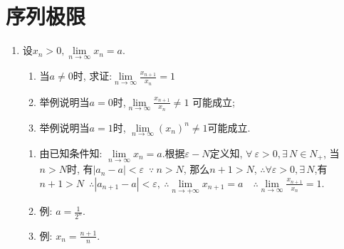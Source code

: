 \section{序列极限}
\begin{enumerate}
	\item 设$x_n>0, \lim\limits_{n\rightarrow \infty}x_n=a$.
	\begin{enumerate}
		\item 当$a\ne 0$时, 求证:$\lim\limits_{n \rightarrow \infty}\frac{x_{n+1}}{x_{n}}=1$
		\item 举例说明当$a=0$时,$\lim\limits_{n \rightarrow \infty}\frac{x_{n+1}}{x_{n}} \ne 1$ 可能成立;
		\item 举例说明当$a=1$时, $\lim\limits_{n \rightarrow \infty}(x_n)^n\ne 1$可能成立.
	\end{enumerate}
	\begin{solution}
		\begin{enumerate}
			\item 由已知条件知: $\lim\limits_{n\rightarrow \infty}x_n=a$.根据$\varepsilon-N$定义知, $\forall\ \varepsilon>0, \exists\, N \in N_+$, 当$n>N$时, 有$|a_n-a|<\varepsilon$\ $\because \ n>N$, 那么$n+1>N$, $\therefore \forall \varepsilon>0, \exists \,N$,有$n+1>N$\  $\therefore |a_{n+1}-a|<\varepsilon,\ \therefore \lim\limits_{n\rightarrow +\infty}x_{n+1}=a$\ \ 
			$\therefore\lim\limits_{n \rightarrow \infty}\frac{x_{n+1}}{x_{n}}=1$.
			\item 例: $a=\frac{1}{2^n}$.
			\item 例: $x_n=\frac{n+1}{n}$.
		\end{enumerate}
		

\end{solution}
\end{enumerate}
